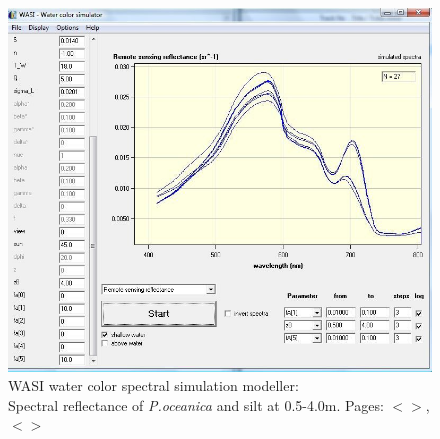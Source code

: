\documentclass[11pt]{article}
\begin{document}
\begin{figure}[h]
	\centering
	\includegraphics[scale=0.30]{Fig-30.jpg}
	\caption{\ac{WASI} water color spectral simulation modeller: \\ Spectral reflectance of \textit{P.oceanica} and silt at 0.5-4.0m. Pages: $<$\pageref{page-35}$>$, $<$\pageref{page-31}$>$}
	\label{fig:4.7}
\end{figure}
\end{document}
